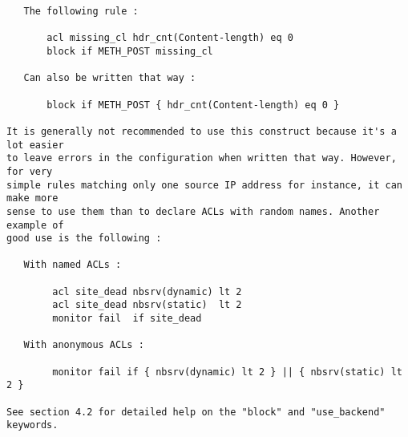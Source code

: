 \begin{verbatim}
   The following rule :

       acl missing_cl hdr_cnt(Content-length) eq 0
       block if METH_POST missing_cl

   Can also be written that way :

       block if METH_POST { hdr_cnt(Content-length) eq 0 }

It is generally not recommended to use this construct because it's a lot easier
to leave errors in the configuration when written that way. However, for very
simple rules matching only one source IP address for instance, it can make more
sense to use them than to declare ACLs with random names. Another example of
good use is the following :

   With named ACLs :

        acl site_dead nbsrv(dynamic) lt 2
        acl site_dead nbsrv(static)  lt 2
        monitor fail  if site_dead

   With anonymous ACLs :

        monitor fail if { nbsrv(dynamic) lt 2 } || { nbsrv(static) lt 2 }

See section 4.2 for detailed help on the "block" and "use_backend" keywords.


\end{verbatim}
